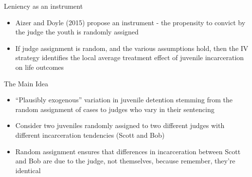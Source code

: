 \documentclass{beamer}
\begin{document}
\begin{frame}{Leniency as an instrument}

		\begin{center}
		\end{center}
		
		\begin{itemize}
		\item Aizer and Doyle (2015) propose an instrument - the propensity to convict by the judge the youth is randomly assigned
		\item If judge assignment is random, and the various assumptions hold, then the IV strategy identifies the local average treatment effect of juvenile incarceration on life outcomes
		\end{itemize}

\end{frame}


\begin{frame}{The Main Idea}

	\begin{itemize}
	\item ``Plausibly exogenous'' variation in juvenile detention stemming from the random assignment of cases to judges who vary in their sentencing
	\item Consider two juveniles randomly assigned to two different judges with different incarceration tendencies (Scott and Bob)
	\item Random assignment ensures that differences in incarceration between Scott and Bob are due to the judge, not themselves, because remember, they're identical
	\end{itemize}
\end{frame}
\end{document}
